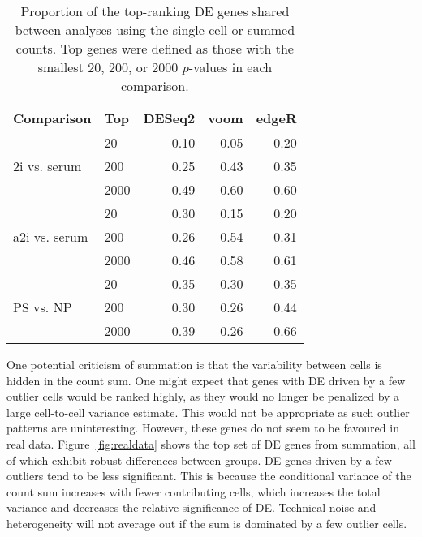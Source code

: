 \documentclass{article}
\begin{document}
\begin{table}[btp]
\caption{Proportion of the top-ranking DE genes shared between analyses using the single-cell or summed counts.
Top genes were defined as those with the smallest 20, 200, or 2000 $p$-values in each comparison.
}
\label{tab:realrank}
\begin{center}
\begin{tabular}{l l r r r}
\hline
\textbf{Comparison} & \textbf{Top} & \textbf{DESeq2} & \textbf{voom} & \textbf{edgeR} \\
\hline
\multirow{3}{*}{2i vs. serum} 
& 20 & 0.10 & 0.05 & 0.20 \\
& 200 & 0.25 & 0.43 & 0.35 \\
& 2000 & 0.49 & 0.60 & 0.60 \\
\hline
\multirow{3}{*}{a2i vs. serum} 
& 20 & 0.30 & 0.15 & 0.20 \\
& 200 & 0.26 & 0.54 & 0.31 \\
& 2000 & 0.46 & 0.58 & 0.61 \\
\hline
\multirow{3}{*}{PS vs. NP} 
& 20 & 0.35 & 0.30 & 0.35 \\
& 200 & 0.30 & 0.26 & 0.44 \\
& 2000 & 0.39 & 0.26 & 0.66 \\
\hline
\end{tabular}
\end{center}
\end{table}

One potential criticism of summation is that the variability between cells is hidden in the count sum.
One might expect that genes with DE driven by a few outlier cells would be ranked highly, as they would no longer be penalized by a large cell-to-cell variance estimate.
This would not be appropriate as such outlier patterns are uninteresting.
However, these genes do not seem to be favoured in real data.
Figure~\ref{fig:realdata} shows the top set of DE genes from summation, all of which exhibit robust differences between groups.
DE genes driven by a few outliers tend to be less significant.
This is because the conditional variance of the count sum increases with fewer contributing cells, 
    which increases the total variance and decreases the relative significance of DE.
Technical noise and heterogeneity will not average out if the sum is dominated by a few outlier cells.

\end{document}
